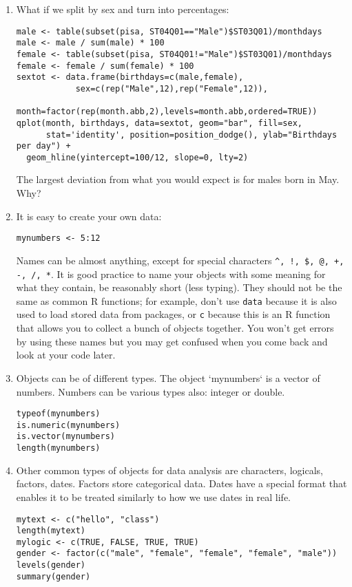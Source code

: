 \documentclass[11pt]{article}
\begin{document}
\begin{enumerate}
\item What if we split by sex and turn into percentages:
\begin{verbatim}
male <- table(subset(pisa, ST04Q01=="Male")$ST03Q01)/monthdays
male <- male / sum(male) * 100
female <- table(subset(pisa, ST04Q01!="Male")$ST03Q01)/monthdays
female <- female / sum(female) * 100
sextot <- data.frame(birthdays=c(male,female),
            sex=c(rep("Male",12),rep("Female",12)),
            month=factor(rep(month.abb,2),levels=month.abb,ordered=TRUE))
qplot(month, birthdays, data=sextot, geom="bar", fill=sex, 
      stat='identity', position=position_dodge(), ylab="Birthdays per day") +
  geom_hline(yintercept=100/12, slope=0, lty=2)
\end{verbatim}
The largest deviation from what you would expect is for males born in May. Why?

\item It is easy to create your own data:

\begin{verbatim}
mynumbers <- 5:12
\end{verbatim}

Names can be almost anything, except for special characters \verb|^, !, $, @, +, -, /, *|. It is good practice to name your objects with some meaning for what they contain, be reasonably short (less typing). They should not be the same as common R functions; for example, don't use \verb|data| because it is also used to load stored data from packages, or \verb|c| because this is an R function that allows you to collect a bunch of objects together. You won't get errors by using these names but you may get confused when you come back and look at your code later. 


\item Objects can be of different types. The object `mynumbers` is a vector of numbers. Numbers can be various types also: integer or double.
\begin{verbatim}
typeof(mynumbers)
is.numeric(mynumbers)
is.vector(mynumbers)
length(mynumbers)
\end{verbatim}

\item 
Other common types of objects for data analysis are characters, logicals, factors, dates. Factors store categorical data. Dates have a special format that enables it to be treated similarly to how we use dates in real life.
\begin{verbatim}
mytext <- c("hello", "class")
length(mytext)
mylogic <- c(TRUE, FALSE, TRUE, TRUE)
gender <- factor(c("male", "female", "female", "female", "male"))
levels(gender)
summary(gender)
\end{verbatim}


\end{enumerate}
\end{document}
